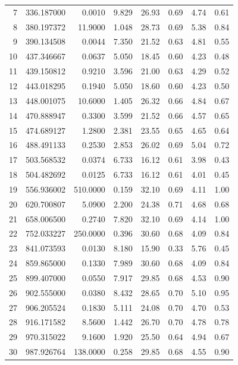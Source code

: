 \begin{longtable}{rrrrrrrr}
7    &   336.187000&    0.0010&  9.829&   26.93&   0.69&  4.74&  0.61\\
8    &   380.197372&   11.9000&  1.048&   28.73&   0.69&  5.38&  0.84\\
9    &   390.134508&    0.0044&  7.350&   21.52&   0.63&  4.81&  0.55\\
10    &   437.346667&    0.0637&  5.050&   18.45&   0.60&  4.23&  0.48\\
11    &   439.150812&    0.9210&  3.596&   21.00&   0.63&  4.29&  0.52\\
12    &   443.018295&    0.1940&  5.050&   18.60&   0.60&  4.23&  0.50\\
13    &   448.001075&   10.6000&  1.405&   26.32&   0.66&  4.84&  0.67\\
14    &   470.888947&    0.3300&  3.599&   21.52&   0.66&  4.57&  0.65\\
15    &   474.689127&    1.2800&  2.381&   23.55&   0.65&  4.65&  0.64\\
16    &   488.491133&    0.2530&  2.853&   26.02&   0.69&  5.04&  0.72\\
17    &   503.568532&    0.0374&  6.733&   16.12&   0.61&  3.98&  0.43\\
18    &   504.482692&    0.0125&  6.733&   16.12&   0.61&  4.01&  0.45\\
19    &   556.936002&  510.0000&  0.159&   32.10&   0.69&  4.11&  1.00\\
20    &   620.700807&    5.0900&  2.200&   24.38&   0.71&  4.68&  0.68\\
21    &   658.006500&    0.2740&  7.820&   32.10&   0.69&  4.14&  1.00\\
22    &   752.033227&  250.0000&  0.396&   30.60&   0.68&  4.09&  0.84\\
23    &   841.073593&    0.0130&  8.180&   15.90&   0.33&  5.76&  0.45\\
24    &   859.865000&    0.1330&  7.989&   30.60&   0.68&  4.09&  0.84\\
25    &   899.407000&    0.0550&  7.917&   29.85&   0.68&  4.53&  0.90\\
26    &   902.555000&    0.0380&  8.432&   28.65&   0.70&  5.10&  0.95\\
27    &   906.205524&    0.1830&  5.111&   24.08&   0.70&  4.70&  0.53\\
28    &   916.171582&    8.5600&  1.442&   26.70&   0.70&  4.78&  0.78\\
29    &   970.315022&    9.1600&  1.920&   25.50&   0.64&  4.94&  0.67\\
30    &   987.926764&  138.0000&  0.258&   29.85&   0.68&  4.55&  0.90\\
\hline
\end{longtable}


